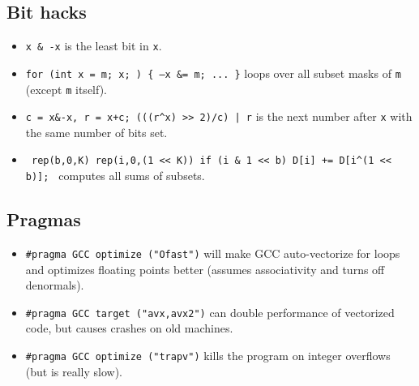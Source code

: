 \subsection{Bit hacks}
\begin{itemize}
	\item \texttt{x \& -x} is the least bit in \texttt{x}.
	\item \texttt{for (int x = m; x; ) \{ --x \&= m; ... \}} loops over all subset masks of \texttt{m} (except \texttt{m} itself).
	\item \texttt{c = x\&-x, r = x+c; (((r\^{}x) >> 2)/c) | r} is the next number after \texttt{x} with the same number of bits set.
	\item \texttt{ rep(b,0,K) rep(i,0,(1 << K)) if (i \& 1 << b) D[i] += D[i\^{}(1 << b)]; } computes all sums of subsets.
\end{itemize}
\subsection{Pragmas}
\begin{itemize}
	\item \lstinline{#pragma GCC optimize ("Ofast")} will make GCC auto-vectorize for loops and optimizes floating points better (assumes associativity and turns off denormals).
	\item \lstinline{#pragma GCC target ("avx,avx2")} can double performance of vectorized code, but causes crashes on old machines.
	\item \lstinline{#pragma GCC optimize ("trapv")} kills the program on integer overflows (but is really slow).
\end{itemize}
